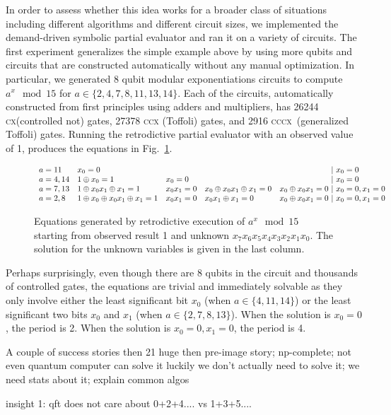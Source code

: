 \documentclass{article}
\newcommand{\cx}{\textsc{cx}}
\newcommand{\ccx}{\textsc{ccx}}
\newcommand{\cccx}{\textsc{cccx}}
\begin{document}
In order to assess whether this idea works for a broader class of
situations including different algorithms and different circuit sizes,
we implemented the demand-driven symbolic partial evaluator and ran it
on a variety of circuits. The first experiment generalizes the simple
example above by using more qubits and circuits that are constructed
automatically without any manual optimization. In particular, we
generated 8 qubit modular exponentiations circuits to compute $a^x
\mod{15}$ for $a \in \{ 2, 4, 7, 8, 11, 13, 14 \}$. Each of the
circuits, automatically constructed from first principles using adders
and multipliers, has 26244 \cx (controlled not) gates, 27378 \ccx
(Toffoli) gates, and 2916 \cccx\ (generalized Toffoli) gates. Running
the retrodictive partial evaluator with an observed value of 1,
produces the equations in Fig.~\ref{fig:shor-eqs}.

\begin{figure}
\[\begin{array}{l@{\quad}llll@{~|~}l}
a=11 & x_0 = 0 &&&& x_0 = 0 \\
a=4,14 & 1 \oplus x_0 = 1 & x_0 = 0 &&
  & x_0 = 0 \\
a=7,13 & 1 \oplus x_0x_1 \oplus x_1 = 1 & x_0x_1 = 0 & x_0 \oplus x_0x_1 \oplus x_1 = 0 &  x_0 \oplus x_0x_1 = 0 & x_0=0, x_1=0 \\
a=2,8 & 1 \oplus x_0 \oplus x_0x_1 \oplus x_1 = 1 & x_0x_1 = 0 & x_0x_1 \oplus x_1 = 0 & x_0 \oplus x_0x_1 = 0  & x_0=0,x_1=0
\end{array}\]
\caption{\label{fig:shor-eqs}Equations generated by retrodictive
  execution of $a^x \mod{15}$ starting from observed result 1 and
  unknown $x_7x_6x_5x_4x_3x_2x_1x_0$. The solution for the unknown
  variables is given in the last column.}
\end{figure}

Perhaps surprisingly, even though there are 8 qubits in the circuit
and thousands of controlled gates, the equations are trivial and
immediately solvable as they only involve either the least significant
bit $x_0$ (when $a \in \{4,11,14\}$) or the least significant two bits
$x_0$ and $x_1$ (when $a \in \{2,7,8,13\}$). When the solution is
$x_0=0$, the period is 2. When the solution is $x_0=0,x_1=0$, the
period is 4.

A couple of success stories
then 21 huge
then pre-image story; np-complete; not even quantum computer can solve it
luckily we don't actually need to solve it; we need stats about it; explain common algos

insight 1: qft does not care about 0+2+4.... vs 1+3+5....
\end{document}
